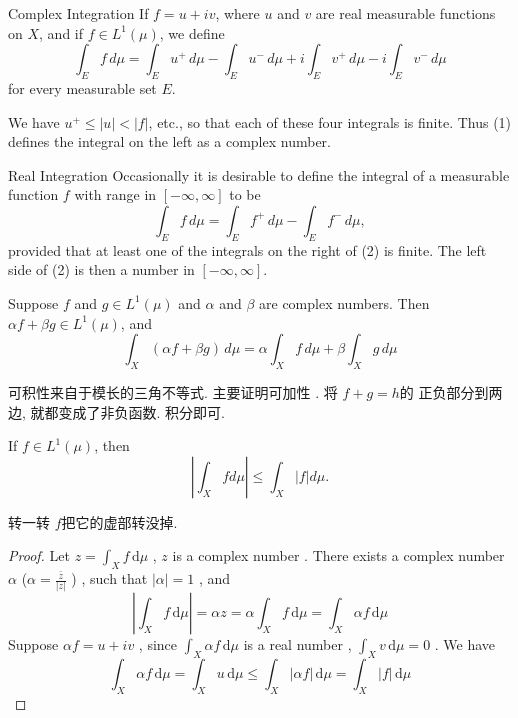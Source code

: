 \documentclass[../main.tex]{subfiles}
\begin{document}
\begin{definition}{Complex Integration}{}
If $f = u + iv$, where $u$ and $v$ are real measurable functions on $X$, and if $f \in L^1(\mu)$, we define
\[
\int_{E} f \,d\mu = \int_{E} u^{+} \,d\mu - \int_{E} u^{-} \,d\mu + i \int_{E} v^{+} \,d\mu - i \int_{E} v^{-} \,d\mu \tag{1}
\]
for every measurable set $E$.
\end{definition}
\begin{remark}
 We have $u^+ \le |u| < |f|$, etc., so that each of these four integrals is finite. Thus (1) defines the integral on the left as a complex number.
\end{remark}

\begin{definition}{Real Integration}{}
Occasionally it is desirable to define the integral of a measurable function $f$ with range in $[-\infty, \infty]$ to be
\[
\int_E f \,d\mu = \int_E f^+ \,d\mu - \int_E f^- \,d\mu, \tag{2}
\]
provided that at least one of the integrals on the right of (2) is finite. The left side of (2) is then a number in $[-\infty, \infty]$.
\end{definition}


\begin{theorem}{}{}
Suppose $f$ and $g \in L^1(\mu)$ and $\alpha$ and $\beta$ are complex numbers. Then $\alpha f + \beta g \in L^1(\mu)$, and
\[
\int_{X} (\alpha f + \beta g) \,d\mu = \alpha \int_{X} f \,d\mu + \beta \int_{X} g \,d\mu
\]
\end{theorem}
\begin{proofsketch}
    可积性来自于模长的三角不等式. 主要证明可加性 . 将 \(  f+ g = h  \)的 正负部分到两边, 就都变成了非负函数. 积分即可. 
\end{proofsketch}
\begin{theorem}{}{}
If $f \in L^1(\mu)$, then
\[
\left| \int_X f d\mu \right| \le \int_X |f| d\mu.
\]
\end{theorem}
\begin{proofsketch}
    转一转 \(  f  \)把它的虚部转没掉.   
\end{proofsketch}
\begin{proof}
    Let \(  z =  \int_{X} f\,\mathrm{d} \mu   \) , \(  z  \) is a complex number .  There exists a complex number \(  \alpha   \) (\(  \alpha = \frac{\bar{z} }{\left| z \right|  }   \) ) , such that \(  \left| \alpha  \right|= 1   \) , and   \[
    \left| \int_{X} f\,\mathrm{d} \mu  \right|=  \alpha z= \alpha \int_{X}f\,\mathrm{d} \mu  = \int_{X} \alpha f \,\mathrm{d} \mu 
    \]   Suppose \(  \alpha f= u+ iv  \) ,  since \(  \int_{X}\alpha f\,\mathrm{d} \mu   \) is a real number , \(  \int_{X}v\,\mathrm{d} \mu = 0  \) . We have \[
    \int_{X}\alpha f\,\mathrm{d} \mu = \int_{X}u\,\mathrm{d} \mu \le \int_{X}\left| \alpha f \right|\,\mathrm{d} \mu = \int_{X}\left| f \right|\,\mathrm{d} \mu   
    \]   
\end{proof}
\end{document}
